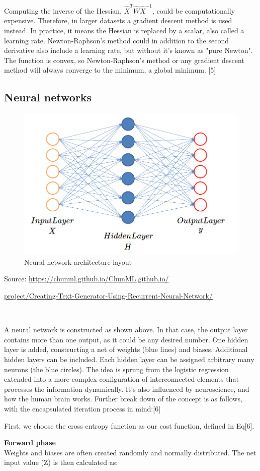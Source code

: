Computing the inverse of the Hessian, $\hat{X}^T\hat{W}\hat{X}^{-1}$, could be computationally expensive. Therefore, in larger datasets a gradient descent method is used instead. 
In practice, it means the Hessian is replaced by a scalar, also called a learning rate. Newton-Raphson's method could in addition to the second derivative also include a learning rate, but without it's known as "pure Newton". The function is convex, so Newton-Raphson's method or any gradient descent method will always converge to the minimum, a global minimum. [5]
\\
\par
	\subsection{Neural networks}
\begin{figure}[H]
\centering
\includegraphics[scale=0.4]{pictures/NN_schematic.png} 
\caption{Neural network architecture layout}
\end{figure}
{\small Source: \url{https://chunml.github.io/ChunML.github.io/} \par  \url{project/Creating-Text-Generator-Using-Recurrent-Neural-Network/}}
\\
\par
A neural network is constructed as shown above. In that case, the output layer contains more than one output, as it could be any desired number. One hidden layer is added, constructing a net of weights (blue lines) and biases. Additional hidden layers can be included. Each hidden layer can be assigned arbitrary many neurons (the blue circles). The idea is sprung from the logistic regression extended into a more complex configuration of interconnected elements that processes the information dynamically. It's also influenced by neuroscience, and how the human brain works. Further break down of the concept is as follows, with the encapsulated iteration process in mind:[6] 
\\
\par
First, we choose the cross entropy function as our cost function, defined in Eq[6].
\\
\par
\textbf{Forward phase}\\
Weights and biases are often created randomly and normally distributed. The net input value (Z) is then calculated as:

